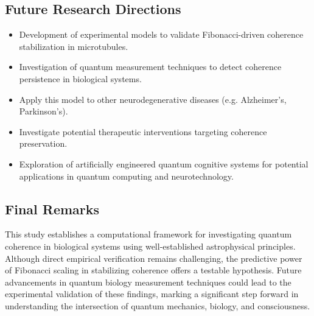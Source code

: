 \subsection{Future Research Directions}
\begin{itemize}
    \item Development of experimental models to validate Fibonacci-driven coherence stabilization in microtubules.
    \item Investigation of quantum measurement techniques to detect coherence persistence in biological systems.
    \item Apply this model to other neurodegenerative diseases (e.g. Alzheimer's, Parkinson's).
    \item Investigate potential therapeutic interventions targeting coherence preservation.
    \item Exploration of artificially engineered quantum cognitive systems for potential applications in quantum computing and neurotechnology.
\end{itemize}

\subsection{Final Remarks}  
This study establishes a computational framework for investigating quantum coherence in biological systems using well-established astrophysical principles. Although direct empirical verification remains challenging, the predictive power of Fibonacci scaling in stabilizing coherence offers a testable hypothesis. Future advancements in quantum biology measurement techniques could lead to the experimental validation of these findings, marking a significant step forward in understanding the intersection of quantum mechanics, biology, and consciousness.

